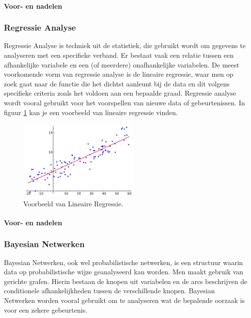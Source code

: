 		\paragraph{Voor- en nadelen}
		
			
	\subsubsection{Regressie Analyse}
	Regressie Analyse is techniek uit de statistiek, die gebruikt wordt om gegevens te analyseren met een specifieke verband. Er bestaat vaak een relatie tussen een afhankelijke variabele en een (of meerdere) onafhankelijke variabelen. De meest voorkomende vorm van regressie analyse is de lineaire regressie, waar men op zoek gaat naar de functie die het dichtst aanleunt bij de data en dit volgens specifieke criteria zoals het voldoen aan een bepaalde graad. Regressie analyse wordt vooral gebruikt voor het voorspellen van nieuwe data of gebeurtenissen. In figuur \ref{fig:regressieAnalyse} kan je een voorbeeld van lineaire regressie vinden.
	\begin{figure}
		\centering
		\includegraphics[width=60mm]{afbeeldingen/regressieAnalyse.PNG}
		\caption{Voorbeeld van Lineaire Regressie.}
		\label{fig:regressieAnalyse}
	\end{figure}
		\paragraph{Voor- en nadelen}
	
	
	\subsubsection{Bayesian Netwerken}
	Bayesian Netwerken, ook wel probabilistische netwerken, is een structuur waarin data op probabilistische wijze geanalyseerd kan worden. Men maakt gebruik van gerichte grafen. Hierin bestaan de knopen uit variabelen en de arcs beschrijven de conditionele afhankelijkheden tussen de verschillende knopen. Bayesian Netwerken worden vooral gebruikt om te analyseren wat de bepalende oorzaak is voor een zekere gebeurtenis. 
	
